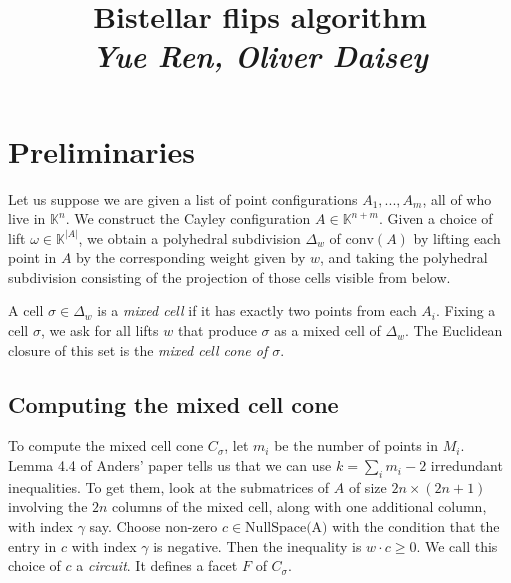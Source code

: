 \documentclass[a4paper,12pt]{article}
\author{}
\date{}
\title{\LARGE \textbf{Bistellar flips algorithm} \\ \vspace{3mm} \Large \textit{Yue Ren, Oliver Daisey}}
\newcommand{\conv}[1]{\text{conv}(#1)}
\begin{document}
\maketitle

\section{Preliminaries}
Let us suppose we are given a list of point configurations $A_1, ..., A_m$, all of who live in $\mathbb{K}^n$. We construct the Cayley configuration $A \in \mathbb{K}^{n+m}$. Given a choice of lift $\omega \in  \mathbb{K}^{|A|}$, we obtain a polyhedral subdivision $\Delta_w$ of $\conv{A}$ by lifting each point in $A$ by the corresponding weight given by $w$, and taking the polyhedral subdivision consisting of the projection of those cells visible from below. 

A cell $\sigma \in \Delta_w$ is a \textit{mixed cell} if it has exactly two points from each $A_i$. Fixing a cell $\sigma$, we ask for all lifts $w$ that produce $\sigma$ as a mixed cell of $\Delta_w$. The Euclidean closure of this set is the \textit{mixed cell cone of $\sigma$}.

\subsection{Computing the mixed cell cone}
To compute the mixed cell cone $C_\sigma$, let $m_i$ be the number of points in $M_i$. Lemma 4.4 of Anders' paper tells us that we can use $k = \sum_i{m_i - 2}$ irredundant inequalities. To get them, look at the submatrices of $A$ of size $2n \times (2n + 1)$ involving the $2n$ columns of the mixed cell, along with one additional column, with index $\gamma$ say. Choose non-zero $c \in \text{NullSpace(A)}$ with the condition that the entry in $c$ with index $\gamma$ is negative. Then the inequality is $w\cdot c \geq 0$. We call this choice of $c$ a \textit{circuit}. It defines a facet $F$ of $C_\sigma$.
\end{document}
